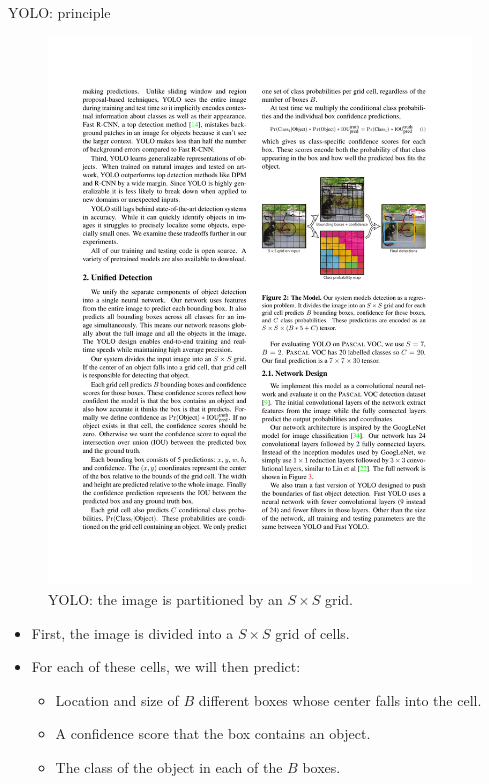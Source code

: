 \documentclass[xcolor=pdftex,dvipsnames,table]{beamer}
\begin{document}
\begin{frame}{YOLO: principle}
\begin{figure}[htb]
   \centering
   \includegraphics[height=0.4\textheight]{../graphics/YOLO_2_v2.pdf}
   \caption{YOLO: the image is partitioned by an $S \times S$ grid.}
\end{figure}
\begin{itemize}
   \item First, the image is divided into a $S \times S$ grid of cells. 
   \item For each of these cells, we will then predict:
   \begin{itemize}
      \item Location and size of $B$ different boxes whose center falls into the cell. 
      \item A confidence score that the box contains an object. 
      \item The class of the object in each of the $B$ boxes. 
   \end{itemize}
\end{itemize}
\end{frame}
\end{document}
